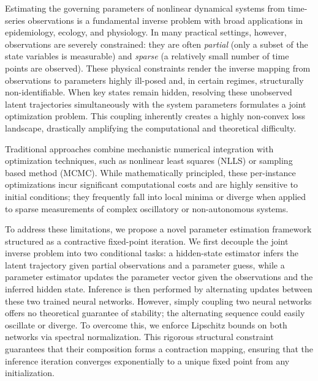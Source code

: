 Estimating the governing parameters of nonlinear dynamical systems from time-series observations is a fundamental inverse problem with broad applications in epidemiology, ecology, and physiology. %
In many practical settings, however, observations are severely constrained: they are often \emph{partial} (only a subset of the state variables is measurable) and \emph{sparse} (a relatively small number of time points are observed). 
These physical constraints render the inverse mapping from observations to parameters highly ill-posed and, in certain regimes, structurally non-identifiable. 
When key states remain hidden, resolving these unobserved latent trajectories simultaneously with the system parameters formulates a joint optimization problem.
This coupling inherently creates a highly non-convex loss landscape, drastically amplifying the computational and theoretical difficulty.

Traditional approaches combine mechanistic numerical integration with optimization techniques, such as nonlinear least squares (NLLS) or sampling based method (MCMC). %
While mathematically principled, these per-instance optimizations incur significant computational costs and are highly sensitive to initial conditions; 
they frequently fall into local minima or diverge when applied to sparse measurements of complex oscillatory or non-autonomous systems.

To address these limitations, we propose a novel parameter estimation framework structured as a contractive fixed-point iteration. 
We first decouple the joint inverse problem into two conditional tasks: a hidden-state estimator infers the latent trajectory given partial observations and a parameter guess, while a parameter estimator updates the parameter vector given the observations and the inferred hidden state. 
Inference is then performed by alternating updates between these two trained neural networks. However, simply coupling two neural networks offers no theoretical guarantee of stability; the alternating sequence could easily oscillate or diverge. 
To overcome this, we enforce Lipschitz bounds on both networks via spectral normalization. 
This rigorous structural constraint guarantees that their composition forms a contraction mapping, ensuring that the inference iteration converges exponentially to a unique fixed point from any initialization.

